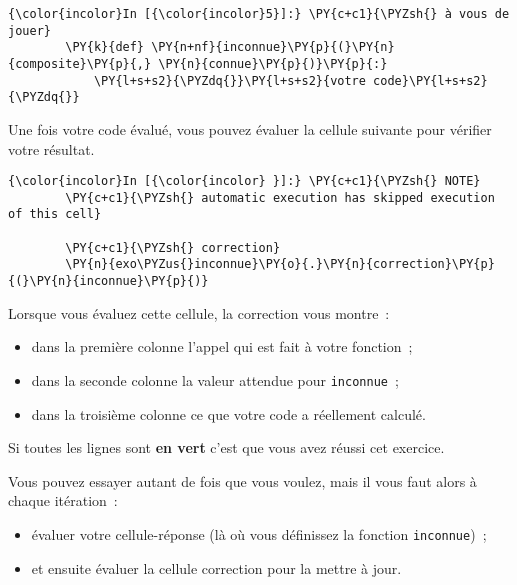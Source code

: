     \begin{Verbatim}[commandchars=\\\{\}]
{\color{incolor}In [{\color{incolor}5}]:} \PY{c+c1}{\PYZsh{} à vous de jouer}
        \PY{k}{def} \PY{n+nf}{inconnue}\PY{p}{(}\PY{n}{composite}\PY{p}{,} \PY{n}{connue}\PY{p}{)}\PY{p}{:}
            \PY{l+s+s2}{\PYZdq{}}\PY{l+s+s2}{votre code}\PY{l+s+s2}{\PYZdq{}}
\end{Verbatim}


    Une fois votre code évalué, vous pouvez évaluer la cellule suivante pour
vérifier votre résultat.

    \begin{Verbatim}[commandchars=\\\{\}]
{\color{incolor}In [{\color{incolor} }]:} \PY{c+c1}{\PYZsh{} NOTE}
        \PY{c+c1}{\PYZsh{} automatic execution has skipped execution of this cell}
        
        \PY{c+c1}{\PYZsh{} correction}
        \PY{n}{exo\PYZus{}inconnue}\PY{o}{.}\PY{n}{correction}\PY{p}{(}\PY{n}{inconnue}\PY{p}{)}
\end{Verbatim}


    Lorsque vous évaluez cette cellule, la correction vous montre~:

\begin{itemize}
\tightlist
\item
  dans la première colonne l'appel qui est fait à votre fonction~;
\item
  dans la seconde colonne la valeur attendue pour \texttt{inconnue}~;
\item
  dans la troisième colonne ce que votre code a réellement calculé.
\end{itemize}

Si toutes les lignes sont \textbf{en vert} c'est que vous avez réussi
cet exercice.

    Vous pouvez essayer autant de fois que vous voulez, mais il vous faut
alors à chaque itération~:

\begin{itemize}
\tightlist
\item
  évaluer votre cellule-réponse (là où vous définissez la fonction
  \texttt{inconnue})~;
\item
  et ensuite évaluer la cellule correction pour la mettre à jour.
\end{itemize}


    
    
    
